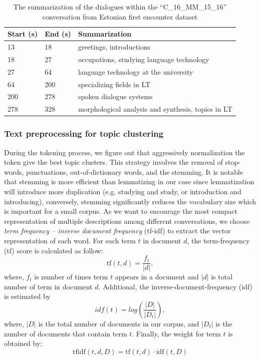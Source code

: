 \documentclass[10pt,journal,compsoc]{IEEEtran}
\begin{document}
\begin{table}[h]
\begin{center}
\begin{tabular}{|l|l|p{4cm}|}
\hline \bf Start (s) & \bf End (s) & \bf Summarization \\ \hline
13 & 18 & greetings, introductions \\
18 & 27 & occupations, studying language technology \\
27 & 64 & language technology at the university \\
64 & 200 & specializing fields in LT \\
200 & 278 & spoken dialogue systems \\
278 & 328 & morphological analysis and synthesis, topics in LT \\
\hline
\end{tabular}
\end{center}
\caption{The summarization of the dialogues within the ``C\_16\_MM\_15\_16'' conversation from Estonian first encounter dataset}
\label{tab:diagsum}
\end{table}

\subsubsection{Text preprocessing for topic clustering}
During the tokening process, we figure out that aggressively normalization the token give the best topic clusters. This strategy involves the removal of stop-words, punctuations, out-of-dictionary words, and the stemming. It is notable that stemming is more efficient than lemmatizing in our case since lemmatization will introduce more duplication (e.g. studying and study, or introduction and introducing), conversely, stemming significantly reduces the vocabulary size which is important for a small corpus. As we want to encourage the most compact representation of multiple descriptions among different conversations, we choose \textit{term frequency – inverse document frequency} (tf-idf) to extract the vector representation of each word. For each term $t$ in document $d$, the term-frequency (tf) score is calculated as follow:
\[
{\displaystyle \mathrm {tf} (t,d)= {\frac {f_t}{|d|}}},
\]
where, $f_t$ is number of times term $t$ appears in a document and $|d|$ is total number of term in document $d$. Additional, the inverse-document-frequency (idf) is estimated by
\[
idf(t) = log(\frac{|D|}{|D_t|}),
\]
where, $|D|$ is the total number of documents in our corpus, and $|D_t|$ is the number of documents that contain term $t$.
Finally, the weight for term $t$ is obtained by:
\[
{\displaystyle \mathrm {tfidf} (t,d,D)=\mathrm {tf} (t,d)\cdot \mathrm {idf} (t,D)}
\]
\end{document}
